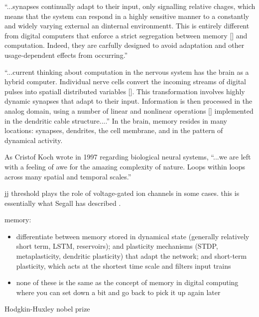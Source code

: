 \vspace{3em}
``...synapses continually adapt to their input, only signalling relative chages, which means that the system can respond in a highly sensitive manner to a constantly and widely varying external an dinternal environmentt. This is entirely different from digital computers that enforce a strict segregation between memory [] and computation. Indeed, they are carfully designed to avoid adaptation and other usage-dependent effects from occurring.'' \cite{ko1997}

\vspace{3em}
``...current thinking about computation in the nervous system has the brain as a hybrid computer. Individual nerve cells convert the incoming streams of digital pulses into spatiall distributed variables []. This transformation involves highly dynamic synapses that adapt to their input. Information is then processed in the analog domain, using a number of linear and nonlinear operations [] implemented in the dendritic cable structure....'' \cite{ko1997} In the brain, memory resides in many locations: synapses, dendrites, the cell membrane, and in the pattern of dynamical activity. 

\vspace{3em}
As Cristof Koch wrote in 1997 regarding biological neural systems, ``...we are left with a feeling of awe for the amazing complexity of nature. Loops within loops across many spatial and temporal scales.'' \cite{ko1997} 

\vspace{3em}
jj threshold plays the role of voltage-gated ion channels in some cases. this is essentially what Segall has described \cite{crsc2010}.

\vspace{3em}
memory: 
\begin{itemize}
\item differentiate between memory stored in dynamical state (generally relatively short term, LSTM, reservoirs); and plasticity mechanisms (STDP, metaplasticity, dendritic plasticity) that adapt the network; and short-term plasticity, which acts at the shortest time scale and filters input trains
\item none of these is the same as the concept of memory in digital computing where you can set down a bit and go back to pick it up again later
\end{itemize}

\vspace{3em}
Hodgkin-Huxley nobel prize

